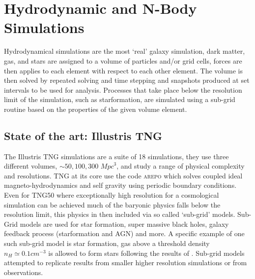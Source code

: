 \section{Hydrodynamic and N-Body Simulations}
\label{sec:Hydro}
Hydrodynamical simulations are the most `real' galaxy simulation, dark matter, gas, and stars are assigned to a volume of particles and/or grid cells, forces are then applies to each element with respect to each other element. The volume is then solved by repeated solving and time stepping and snapshots produced at set intervals to be used for analysis. Processes that take place below the resolution limit of the simulation, such as starformation, are simulated using a sub-grid routine based on the properties of the given volume element.

\subsection{State of the art: Illustris TNG}
The Illustris TNG simulations are a suite of 18 simulations, they use three different volumes, $\sim 50, 100, 300$ ${Mpc}^{3}$, and study a range of physical complexity and resolutions. TNG at its core use the code \textsc{arepo} \citep{Springel2010EMesh} which solves coupled ideal magneto-hydrodynamics and self gravity using periodic boundary conditions. Even for TNG50 where exceptionally high resolution for a cosmological simulation can be achieved much of the baryonic physics falls below the resolution limit, this physics in then included via so called `sub-grid' models. Sub-Grid models are used for star formation, super massive black holes, galaxy feedback process (starformation and AGN) and more. A specific example of one such sub-grid model is star formation, gas above a threshold density $n_H \simeq 0.1cm^{-3}$ is allowed to form stars following the results of \citet{Springel2003CosmologicalFormation}. Sub-grid models attempted to replicate results from smaller higher resolution simulations or from observations. 

